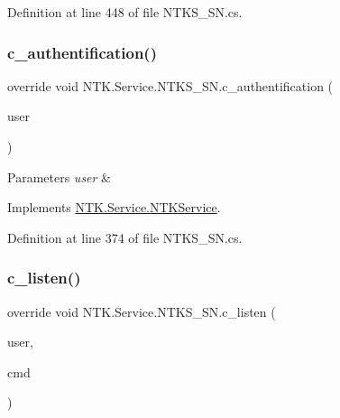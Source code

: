 Definition at line 448 of file N\+T\+K\+S\+\_\+\+S\+N.\+cs.

\mbox{\label{class_n_t_k_1_1_service_1_1_n_t_k_s___s_n_ac025f78ece6a9012aeb014fbd486aee7}} 
\subsubsection{\texorpdfstring{c\_authentification()}{c\_authentification()}}
{\footnotesize\ttfamily override void N\+T\+K.\+Service.\+N\+T\+K\+S\+\_\+\+S\+N.\+c\+\_\+authentification (\begin{DoxyParamCaption}\item[{\mbox{\hyperlink{class_n_t_k_1_1_n_t_k_user}{N\+T\+K\+User}}}]{user }\end{DoxyParamCaption})\hspace{0.3cm}{\ttfamily [virtual]}}






\begin{DoxyParams}{Parameters}
{\em user} & \\
\hline
\end{DoxyParams}


Implements \mbox{\hyperlink{class_n_t_k_1_1_service_1_1_n_t_k_service_a8c2fd33b41da5a4edf9911682dfd36cd}{N\+T\+K.\+Service.\+N\+T\+K\+Service}}.



Definition at line 374 of file N\+T\+K\+S\+\_\+\+S\+N.\+cs.

\mbox{\label{class_n_t_k_1_1_service_1_1_n_t_k_s___s_n_a70710f4c30863d2cab91c62b9f52a040}} 
\subsubsection{\texorpdfstring{c\_listen()}{c\_listen()}}
{\footnotesize\ttfamily override void N\+T\+K.\+Service.\+N\+T\+K\+S\+\_\+\+S\+N.\+c\+\_\+listen (\begin{DoxyParamCaption}\item[{\mbox{\hyperlink{class_n_t_k_1_1_n_t_k_user}{N\+T\+K\+User}}}]{user,  }\item[{String}]{cmd }\end{DoxyParamCaption})\hspace{0.3cm}{\ttfamily [virtual]}}






